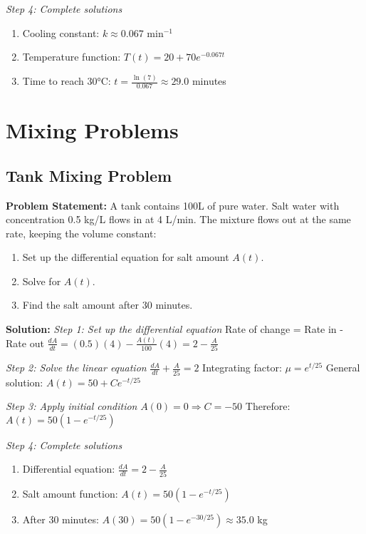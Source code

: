 \documentclass[12pt, letterpaper]{book}
\begin{document}
\textit{Step 4: Complete solutions}
\begin{enumerate}
    \item Cooling constant: $k \approx 0.067$ min$^{-1}$
    \item Temperature function: $T(t) = 20 + 70e^{-0.067t}$
    \item Time to reach 30°C: $t = \frac{\ln(7)}{0.067} \approx 29.0$ minutes
\end{enumerate}

\section{Mixing Problems}

\subsection{Tank Mixing Problem}
\textbf{Problem Statement:}
A tank contains 100L of pure water. Salt water with concentration 0.5 kg/L flows in at 4 L/min. The mixture flows out at the same rate, keeping the volume constant:
\begin{enumerate}
    \item Set up the differential equation for salt amount $A(t)$.
    \item Solve for $A(t)$.
    \item Find the salt amount after 30 minutes.
\end{enumerate}

\textbf{Solution:}
\textit{Step 1: Set up the differential equation}
Rate of change = Rate in - Rate out
$\frac{dA}{dt} = (0.5)(4) - \frac{A(t)}{100}(4) = 2 - \frac{A}{25}$

\textit{Step 2: Solve the linear equation}
$\frac{dA}{dt} + \frac{A}{25} = 2$
Integrating factor: $\mu = e^{t/25}$
General solution: $A(t) = 50 + Ce^{-t/25}$

\textit{Step 3: Apply initial condition}
$A(0) = 0 \Rightarrow C = -50$
Therefore: $A(t) = 50(1 - e^{-t/25})$

\textit{Step 4: Complete solutions}
\begin{enumerate}
    \item Differential equation: $\frac{dA}{dt} = 2 - \frac{A}{25}$
    \item Salt amount function: $A(t) = 50(1 - e^{-t/25})$
    \item After 30 minutes: $A(30) = 50(1 - e^{-30/25}) \approx 35.0$ kg
\end{enumerate}
\end{document}
